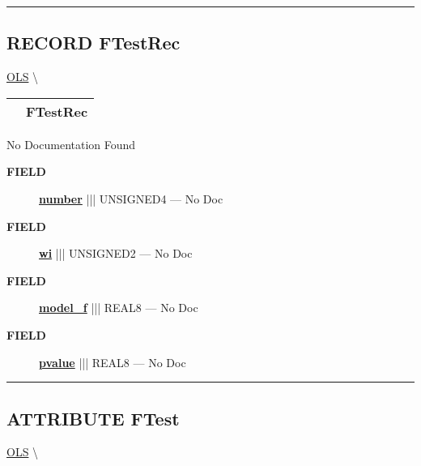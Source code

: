 \rule{\linewidth}{0.5pt}
\subsection*{\textsf{\colorbox{headtoc}{\color{white} RECORD}
FTestRec}}

\hypertarget{ecldoc:linearregression.ols.ftestrec}{}
\hspace{0pt} \hyperlink{ecldoc:linearregression.ols}{OLS} \textbackslash 

{\renewcommand{\arraystretch}{1.5}
\begin{tabularx}{\textwidth}{|>{\raggedright\arraybackslash}l|X|}
\hline
\hspace{0pt}\mytexttt{\color{red} } & \textbf{FTestRec} \\
\hline
\end{tabularx}
}

\par





No Documentation Found







\par
\begin{description}
\item [\colorbox{tagtype}{\color{white} \textbf{\textsf{FIELD}}}] \textbf{\underline{number}} ||| UNSIGNED4 --- No Doc
\item [\colorbox{tagtype}{\color{white} \textbf{\textsf{FIELD}}}] \textbf{\underline{wi}} ||| UNSIGNED2 --- No Doc
\item [\colorbox{tagtype}{\color{white} \textbf{\textsf{FIELD}}}] \textbf{\underline{model\_f}} ||| REAL8 --- No Doc
\item [\colorbox{tagtype}{\color{white} \textbf{\textsf{FIELD}}}] \textbf{\underline{pvalue}} ||| REAL8 --- No Doc
\end{description}





\rule{\linewidth}{0.5pt}
\subsection*{\textsf{\colorbox{headtoc}{\color{white} ATTRIBUTE}
FTest}}

\hypertarget{ecldoc:linearregression.ols.ftest}{}
\hspace{0pt} \hyperlink{ecldoc:linearregression.ols}{OLS} \textbackslash 

